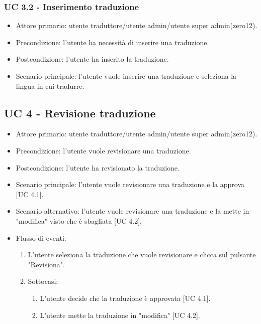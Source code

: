     \subsubsection{UC 3.2 - Inserimento traduzione}
        \begin{itemize}
            \item Attore primario: utente traduttore/utente admin/utente super admin(zero12).
            \item Precondizione: l'utente ha necessità di inserire una traduzione.
            \item Postcondizione: l'utente ha inserito la traduzione.
            \item Scenario principale: l'utente vuole inserire una traduzione e seleziona la lingua in cui tradurre.
        \end{itemize}
\subsection{UC 4 - Revisione traduzione}
    \begin{itemize}
        \item Attore primario: utente traduttore/utente admin/utente super admin(zero12).
        \item Precondizione: l'utente vuole revisionare una traduzione.
        \item Postcondizione: l'utente ha revisionato la traduzione.
        \item Scenario principale: l'utente vuole revisionare una traduzione e la approva [UC 4.1].
        \item Scenario alternativo: l'utente vuole revisionare una traduzione e la mette in "modifica" visto che è sbagliata [UC 4.2].
        \item Flusso di eventi:
            \begin{enumerate}
                \item L'utente seleziona la traduzione che vuole revisionare e clicca sul pulsante "Revisiona".
                \item Sottocasi:
                    \begin{enumerate}
                        \item L'utente decide che la traduzione è approvata [UC 4.1].
                        \item L'utente mette la traduzione in "modifica" [UC 4.2].
                    \end{enumerate}
            \end{enumerate}
    \end{itemize}
